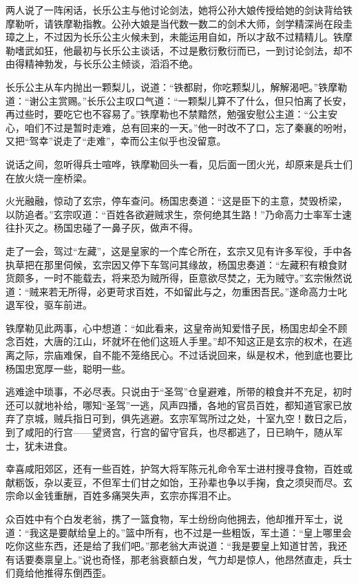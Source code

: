 \documentclass[12pt,oneside]{book}
\begin{document}
两人说了一阵闲话，长乐公主与他讨论剑法，她将公孙大娘传授给她的剑诀背给铁摩勒听，请铁摩勒指教。公孙大娘是当代数一数二的剑术大师，剑学精深尚在段圭璋之上，不过因为长乐公主火候未到，未能运用自如，所以才敌不过精精儿。铁摩勒嗜武如狂，他最初与长乐公主谈话，不过是敷衍敷衍而已，一到讨论剑法，却不由得精神勃发，与长乐公主倾谈，滔滔不绝。

长乐公主从车内抛出一颗梨儿，说道：``铁都尉，你吃颗梨儿，解解渴吧。''铁摩勒道：``谢公主赏赐。''长乐公主叹口气道：``一颗梨儿算不了什么，但只怕离了长安，再过些时，要吃它也不容易了。''铁摩勒也不禁黯然，勉强安慰公主道：``公主安心，咱们不过是暂时走难，总有回来的一天。''他一时改不了口，忘了秦襄的吩咐，又把``驾幸''说走了``走难''，幸而公主似乎也没留意。

说话之间，忽听得兵士喧哗，铁摩勒回头一看，见后面一团火光，却原来是兵士们在放火烧一座桥梁。

火光融融，惊动了玄宗，停车查问。杨国忠奏道：``这是臣下的主意，焚毁桥梁，以防追者。''玄宗叹道：``百姓各欲避贼求生，奈何绝其生路！''乃命高力士率军士速往扑灭之。杨国忠碰了一鼻子灰，做声不得。

走了一会，驾过``左藏''，这是皇家的一个库仑所在，玄宗又见有许多军役，手中各执草把在那里伺候，玄宗因又停下车驾问其缘故，杨国忠奏道：``左藏积有粮食财货颇多，一时不能载去，将来恐为贼所得，臣意欲尽焚之，无为贼守。''玄宗愀然说道：``贼来若无所得，必更苛求百姓，不如留此与之，勿重困吾民。''遂命高力士叱退军役，驱车前进。

铁摩勒见此两事，心中想道：``如此看来，这皇帝尚知爱惜子民，杨国忠却全不顾念百姓，大唐的江山，坏就坏在他们这班人手里。''却不知这正是玄宗的权术，在逃离之际，宗庙难保，自不能不笼络民心。不过话说回来，纵是权术，他到底也要比杨国忠宽厚一些，聪明一些。

逃难途中琐事，不必尽表。只说由于``圣驾''仓皇避难，所带的粮食并不充足，初时还可以就地补给，哪知``圣驾''一逃，风声四播，各地的官员百姓，都知道官家已放弃了京城，贼兵指日可到，俱先逃避。玄宗军驾所过之处，十室九空！数日之后，到了咸阳的行宫------望贤宫，行宫的留守官兵，也尽都逃了，日已晌午，随从军士，犹未进食。

幸喜咸阳郊区，还有一些百姓，护驾大将军陈元礼命令军士进村搜寻食物，百姓或献粝饭，杂以麦豆，不但军士们甘之如饴，王孙辈也争以手掬，食之须臾而尽。玄宗命以金钱重酬，百姓多痛哭失声，玄宗亦挥泪不止。

众百姓中有个白发老翁，携了一篮食物，军士纷纷向他拥去，他却推开军士，说道：``我这是要献给皇上的。''篮中所有，也不过是一些粗饭，军土道：``皇上哪里会吃你这些东西，还是给了我们吧。''那老翁大声说道：``我是要皇上知道甘苦，我还有话要奏禀皇上。''说也奇怪，那老翁衰额白发，气力却是惊人，他昂然直走，兵士们竟给他推得东倒西歪。
\end{document}
